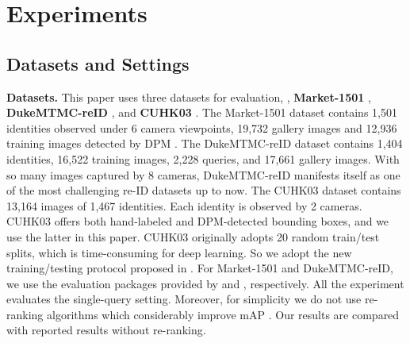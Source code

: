 \documentclass[10pt,twocolumn,letterpaper]{article}
\begin{document}

\section{Experiments}\label{sec:experiment}
\subsection{Datasets and Settings}
\textbf{Datasets.} This paper uses three datasets for evaluation, \ie, \textbf{Market-1501} \cite{DBLP:conf/iccv/ZhengSTWWT15}, \textbf{DukeMTMC-reID} \cite{ristani2016MTMC,zheng2017unlabeled}, and \textbf{CUHK03} \cite{DBLP:conf/cvpr/LiZXW14}. The Market-1501 dataset contains 1,501 identities observed under 6 camera viewpoints, 19,732 gallery images and 12,936 training images detected by DPM \cite{felzenszwalb2008discriminatively}. The DukeMTMC-reID dataset contains 1,404 identities, 16,522 training images, 2,228 queries, and 17,661 gallery images. With so many images captured by 8 cameras, DukeMTMC-reID manifests itself as one of the most challenging re-ID datasets up to now. The CUHK03 dataset contains 13,164 images of 1,467 identities. Each identity is observed by 2 cameras. CUHK03 offers both hand-labeled and DPM-detected bounding boxes, and we use the latter in this paper. CUHK03 originally adopts 20 random train/test splits, which is time-consuming for deep learning. So we adopt the new training/testing protocol proposed in \cite{DBLP:conf/cvpr/ZhongZCL17}. For Market-1501 and DukeMTMC-reID, we use the evaluation packages provided by \cite{DBLP:conf/iccv/ZhengSTWWT15} and \cite{zheng2017unlabeled}, respectively.
All the experiment evaluates the single-query setting. 
Moreover, for simplicity we do not use re-ranking algorithms which considerably improve mAP \cite{DBLP:conf/cvpr/ZhongZCL17}. Our results are compared with reported results without re-ranking.
\end{document}
